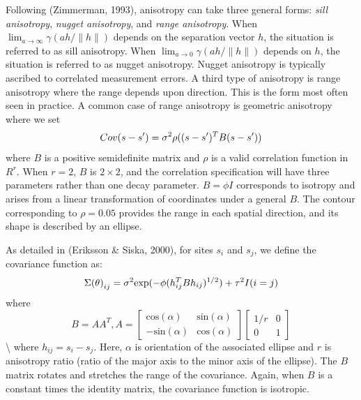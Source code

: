 \documentclass[12pt,twoside]{dukestatscithesis}
\theoremstyle{definition}
\theoremstyle{definition}
\theoremstyle{definition}
\theoremstyle{remark}
\begin{document}
Following (Zimmerman, 1993), anisotropy can take three general forms:
\textit{sill anisotropy}, \textit{nugget anisotropy}, and
\textit{range anisotropy}. When
\(\lim_{a\to\infty}\gamma(ah/\rVert h \rVert)\) depends on the
separation vector \(h\), the situation is referred to as sill
anisotropy. When \(\lim_{a\to0}\gamma(ah/\rVert h \rVert)\) depends on
\(h\), the situation is referred to as nugget anisotropy. Nugget
anisotropy is typically ascribed to correlated measurement errors. A
third type of anisotropy is range anisotropy where the range depends
upon direction. This is the form most often seen in practice. A common
case of range anisotropy is geometric anisotropy where we set
\begin{equation}
Cov(s - s') = \sigma^2\rho((s - s')^TB(s - s'))\\
\end{equation}
where \(B\) is a positive semidefinite matrix and \(\rho\) is a valid
correlation function in \(R^r\). When \(r=2\), \(B\) is \(2 \times 2\),
and the correlation specification will have three parameters rather than
one decay parameter. \(B = \phi I\) corresponds to isotropy and arises
from a linear transformation of coordinates under a general \(B\). The
contour corresponding to \(\rho = 0.05\) provides the range in each
spatial direction, and its shape is described by an ellipse.

As detailed in (Eriksson \& Siska, 2000), for sites \(s_i\) and \(s_j\),
we define the covariance function as:
\begin{equation}
\Sigma{(\theta)}_{ij} = \sigma^2\text{exp}(-\phi (h_{ij}^{T}Bh_{ij})^{1/2}) + \tau^2 I(i = j)\\
\end{equation}
where
\begin{equation}
B = AA^{T}, A =
 \begin{bmatrix}
\text{cos}(\alpha) & \text{sin}(\alpha) \\
-\text{sin}(\alpha) & \text{cos}(\alpha)
\end{bmatrix}
\begin{bmatrix}
1/r & 0\\
0 & 1
\end{bmatrix}
\end{equation}
\textbackslash{} where \(h_{ij} = s_i - s_j\). Here, \(\alpha\) is
orientation of the associated ellipse and \(r\) is anisotropy ratio
(ratio of the major axis to the minor axis of the ellipse). The \(B\)
matrix rotates and stretches the range of the covariance. Again, when
\(B\) is a constant times the identity matrix, the covariance function
is isotropic.
\end{document}
